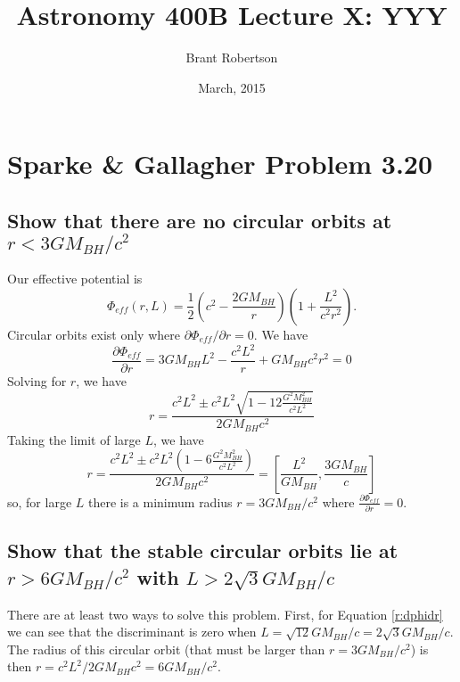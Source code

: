 \documentclass[]{article}
\title{Astronomy 400B Lecture X: YYY}
\author{Brant Robertson}
\date{March, 2015}
\begin{document}
\maketitle

\section{Sparke \& Gallagher Problem 3.20}

\subsection{Show that there are no circular orbits at $r<3GM_{BH}/c^2$}

Our effective potential is
\begin{equation}
\Phi_{eff}(r,L) = \frac{1}{2}\left(c^2-\frac{2GM_{BH}}{r}\right)\left(1+ \frac{L^2}{c^2r^2}\right).
\end{equation}
\noindent
Circular orbits exist only where $\partial \Phi_{eff}/\partial r = 0$.  We have
\begin{equation}
\frac{\partial \Phi_{eff}}{\partial r} = 3GM_{BH}L^2 - \frac{c^2L^2}{r} + GM_{BH}c^2r^2 =0
\end{equation}
Solving for $r$, we have
\begin{equation}
\label{r:dphidr}
r = \frac{c^2L^2 \pm c^2 L^2 \sqrt{1-12\frac{G^2M_{BH}^2}{c^2L^2}} }{2GM_{BH}c^2}
\end{equation}
\noindent
Taking the limit of large $L$, we have
\begin{equation}
r = \frac{c^2L^2 \pm c^2 L^2 \left( 1-6 \frac{G^2M_{BH}^2}{c^2L^2}\right) }{2GM_{BH}c^2} = \left[\frac{L^2}{GM_{BH}}, \frac{3GM_{BH}}{c}\right]
\end{equation}
\noindent
so, for large $L$ there is a minimum radius $r = 3GM_{BH}/c^2$ where $\frac{\partial \Phi_{eff}}{\partial r}=0$.

\subsection{Show that the stable circular orbits lie at $r>6GM_{BH}/c^2$ with $L>2\sqrt{3}GM_{BH}/c$}

There are at least two ways to solve this problem.  First, for Equation \ref{r:dphidr} 
we can see that the discriminant is zero when $L = \sqrt{12}GM_{BH}/c = 2 \sqrt{3} G M_{BH}/c$.
The radius of this circular orbit (that must be larger than $r = 3 GM_{BH}/c^2$) is then $r = c^2 L^2 / 2 GM_{BH} c^2 = 6 G M_{BH} / c^2$.
\end{document}
